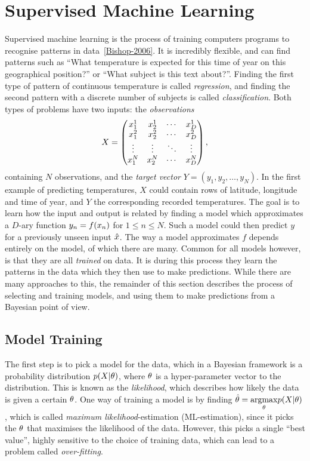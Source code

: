 \section{Supervised Machine Learning}
Supervised machine learning is the process of training computers programs to
recognise patterns in data~\ref{Bishop-2006}. It is incredibly
flexible, and can find patterns such as ``What
temperature is expected for this time of year on this geographical
position?'' or ``What subject is this text about?''. Finding the first
type of pattern of continuous temperature is called
\textit{regression}, and finding the
second pattern with a discrete number of subjects is called
\textit{classification}. Both types of problems have two inputs: 
the \textit{observations}
\[X =
  \begin{pmatrix}
    x_{1}^{1} & x_{2}^{1} & \cdots & x_{D}^{1} \\
    x_{1}^{2} & x_{2}^{2} & \cdots & x_{D}^{2} \\
    \vdots  & \vdots  & \ddots & \vdots  \\
    x_{1}^{N} & x_{2}^{N} & \cdots & x_{D}^{N} \\
  \end{pmatrix},
\]
containing $N$ observations, and the \textit{target vector} $Y = (y_{1},
y_{2}, \dots, y_{N})$. In the first example of predicting temperatures,
$X$ could contain rows of latitude, longitude and time of year, and $Y$ the
corresponding recorded temperatures. The
goal is to learn how the input and output is related by finding a model which approximates a $D$-ary function $y_n =
f(x_n)$ for $1 \leq n \leq N$. Such a model could then
predict $y$ for a previously unseen input $\hat{x}$. The way a
model approximates $f$ depends entirely on the model, of which there
are many. Common for all models however, is that they are all \textit{trained}
on data. It is during this process they learn the patterns in the data
which they then use to make predictions.
While there are many approaches to this, the remainder of this
section describes the process of selecting and training models,
and using them to make predictions from a Bayesian point of view.

\subsection{Model Training}
The first step is to pick a model for the data, which in a Bayesian
framework is a probability distribution $p(X \vert \theta)$, where
$\theta$ is a hyper-parameter vector to the distribution.
This is known as the \textit{likelihood}, which describes how likely
the data is given a certain $\theta$. One way of training a model is
by finding $\hat{\theta} = \underset{\theta}{\mathrm{argmax}} p(X \vert \theta)$, 
which is called \textit{maximum likelihood}-estimation (ML-estimation), since it picks the
$\theta$ that maximises the likelihood of the data. However, this picks a single
``best value'', highly sensitive to the choice of training data, which
can lead to a problem called \textit{over-fitting}.

